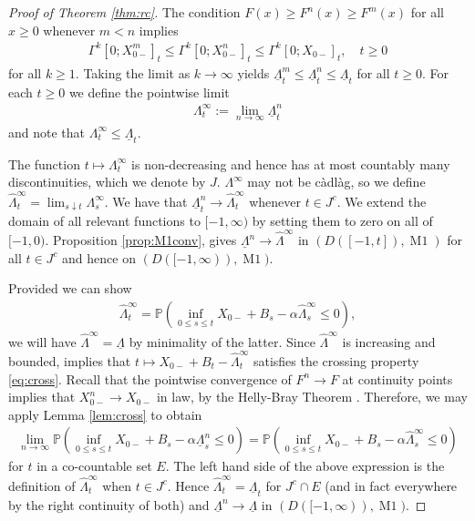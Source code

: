 \documentclass[12pt]{amsart}
\newcommand{\wh}{\widehat}
\newcommand{\ubar}{\underline}
\newcommand{\bP}{\mathbb{P}}
\theoremstyle{plain}
\theoremstyle{definition}
\begin{document}
\begin{proof}[Proof of Theorem \ref{thm:rc}]
The condition $F(x)\ge F^n(x)\ge F^m(x)$ for all $x\ge 0$ whenever $m<n$ implies
\begin{align}
\Gamma^{k}[0;X_{0-}^m]_t\le \Gamma^{k}[0;X_{0-}^n]_t \le \Gamma^{k}[0;X_{0-}]_t,\quad t\ge 0
\end{align}
for all $k\ge 1$. Taking the limit as $k\to\infty$ yields $\ubar{\Lambda}^m_t\le \ubar{\Lambda}^n_t \le \ubar{\Lambda}_t$ for all $t\ge 0$. For each $t\ge 0$ we define the pointwise limit
\begin{align}\label{eq:pw}
\Lambda^\infty_t := \lim_{n\to\infty} \ubar{\Lambda}^n_t
\end{align}
and note that $\Lambda^\infty_t\le  \ubar{\Lambda}_t$.

\medskip

The function $t\mapsto \Lambda^\infty_t$ is non-decreasing and hence has at most countably many discontinuities, which we denote by $J$. $\Lambda^\infty$ may not be c\`adl\`ag, so we define $\wh{\Lambda}^\infty_t = \lim_{s\downarrow t}\Lambda^\infty_s$. We have that $\ubar{\Lambda}^n_t \to \wh{\Lambda}^\infty_t$ whenever $t\in J^c$. We extend the domain of all relevant functions to $[-1,\infty)$ by setting them to zero on all of $[-1,0)$. Proposition \ref{prop:M1conv}, gives $\ubar{\Lambda}^n\to \wh{\Lambda}^\infty$ in $(D([-1,t]),\operatorname{M1})$ for all $t\in J^c$ and hence on $(D([-1,\infty)),\operatorname{M1})$.

\medskip

Provided we can show
\begin{align}\label{eq:limit}
\wh\Lambda^\infty_t=\bP (\inf_{0\le s\le t}X_{0-}+B_s-\alpha\wh\Lambda^\infty_s\le 0),
\end{align}
we will have $\wh\Lambda^\infty = \ubar{\Lambda}$ by minimality of the latter. Since $\wh\Lambda^\infty$ is increasing and bounded, \cite[proof of Proposition 3.4(i)]{antunovic_isolated_2011} implies that $t\mapsto X_{0-}+B_t-\wh\Lambda^\infty_t$ satisfies the crossing property \eqref{eq:cross}.
Recall that the pointwise convergence of $F^n\to F$ at continuity points implies that $X^n_{0-}\to X_{0-}$ in law, by the Helly-Bray Theorem \cite[Theorem 11.1.2]{dudley_real_2002}.
Therefore, we may apply Lemma \ref{lem:cross} to obtain
\begin{align}\label{eq:verified}
\lim_{n\to\infty}\bP (\inf_{0\le s\le t}X_{0-}+B_s-\alpha\ubar{\Lambda}^n_s\le 0)=\bP (\inf_{0\le s\le t}X_{0-}+B_s-\alpha\wh\Lambda^\infty_s \le 0)
\end{align}
for $t$ in a co-countable set $E$. The left hand side of the above expression is the definition of $\wh\Lambda^\infty_t$ when $t\in J^c$.
Hence $\wh\Lambda^\infty_t = \ubar{\Lambda}_t$ for $J^c \cap E$ (and in fact everywhere by the right continuity of both) and $\ubar{\Lambda}^n\to \ubar{\Lambda}$ in $(D([-1,\infty)),\operatorname{M1})$. \qedhere

\end{proof}
\end{document}
